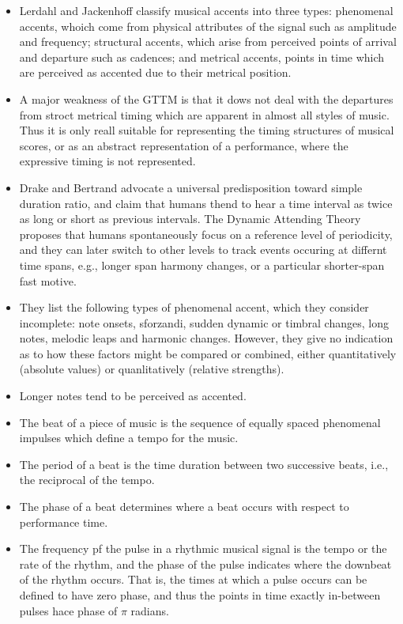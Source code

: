 \documentclass{scrartcl}
\begin{document}
\begin{itemize}
\item Lerdahl and Jackenhoff \cite{Lerdahl1985} classify musical accents into three types: phenomenal accents, whoich come from physical attributes of the signal such as amplitude and frequency; structural accents, which arise from perceived points of arrival and departure such as cadences; and metrical accents, points in time which are perceived as accented due to their metrical position.
\item A major weakness of the GTTM is that it dows not deal with the departures from stroct metrical timing which are apparent in almost all styles of music. Thus it is only reall suitable for representing the timing structures of musical scores, or as an abstract representation of a performance, where the expressive timing is not represented.
\item Drake and Bertrand \cite{Drake2001} advocate a universal predisposition toward simple duration ratio, and claim that humans thend to hear a time interval as twice as long or short as previous intervals. The Dynamic Attending Theory \cite{Jones1989} proposes that humans spontaneously focus on a reference level of periodicity, and they can later switch to other levels to track events occuring at differnt time spans, e.g., longer span harmony changes, or a particular shorter-span fast motive. 
\item They list the following types of phenomenal accent, which they consider incomplete: note onsets, sforzandi, sudden dynamic or timbral changes, long notes, melodic leaps and harmonic changes. However, they give no indication as to how these factors might be compared or combined, either quantitatively (absolute values) or quanlitatively (relative strengths).
\item Longer notes tend to be perceived as accented.
\item The beat of a piece of music is the sequence of equally spaced phenomenal impulses which define a tempo for the music. 
\item The period of a beat is the time duration between two successive beats, i.e., the reciprocal of the tempo.
\item The phase of a beat determines where a beat occurs with respect to performance time.
\item The frequency pf the pulse in a rhythmic musical signal is the tempo or the rate of the rhythm, and the phase of the pulse indicates where the downbeat of the rhythm occurs. That is, the times at which a pulse occurs can be defined to have zero phase, and thus the points in time exactly in-between pulses hace phase of $\pi$ radians.

\end{itemize}
\end{document}
